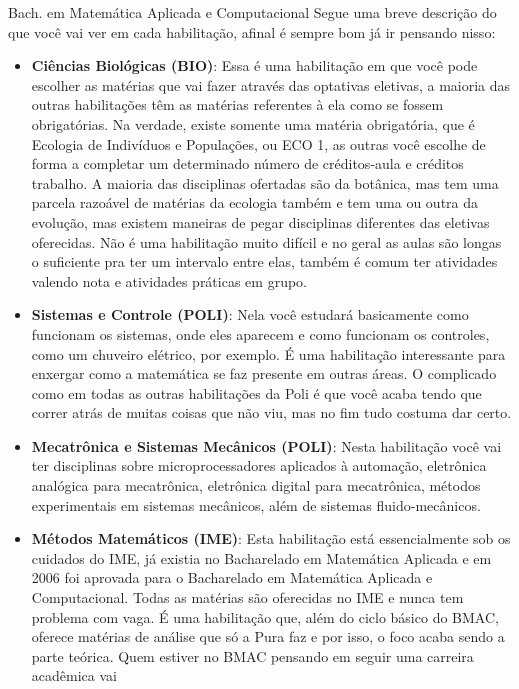 \begin{subsecao}{Bach. em Matemática Aplicada e Computacional}
Segue uma breve descrição do que você vai ver em cada habilitação, afinal é sempre bom já ir pensando nisso:

\begin{itemize}
  \item \textbf{Ciências Biológicas (BIO)}:
    Essa é uma habilitação em que você pode escolher as matérias que vai fazer
    através das optativas eletivas, a maioria das outras habilitações têm as
    matérias referentes à ela como se fossem obrigatórias. Na verdade, existe
    somente uma matéria obrigatória, que é Ecologia de Indivíduos e Populações,
    ou ECO 1, as outras você escolhe de forma a completar um determinado número
    de créditos-aula e créditos trabalho. A maioria das disciplinas ofertadas
    são da botânica, mas tem uma parcela razoável de matérias da ecologia também
    e tem uma ou outra da evolução, mas existem maneiras de pegar disciplinas
    diferentes das eletivas oferecidas. Não é uma habilitação muito difícil e no
    geral as aulas são longas o suficiente pra ter um intervalo entre elas,
    também é comum ter atividades valendo nota e atividades práticas em grupo.
  \item \textbf{Sistemas e Controle (POLI)}: Nela você estudará basicamente como
    funcionam os sistemas, onde eles aparecem e como funcionam os controles,
    como um chuveiro elétrico, por exemplo. É uma habilitação interessante para
    enxergar como a matemática se faz presente em outras áreas. O complicado
    como em todas as outras habilitações da Poli é que você acaba tendo que
    correr atrás de muitas coisas que não viu, mas no fim tudo costuma dar
    certo.
  \item \textbf{Mecatrônica e Sistemas Mecânicos (POLI)}: Nesta habilitação você
    vai ter disciplinas sobre microprocessadores aplicados à automação,
    eletrônica analógica para mecatrônica, eletrônica digital para mecatrônica,
    métodos experimentais em sistemas mecânicos, além de sistemas
    fluido-mecânicos.
  \item \textbf{Métodos Matemáticos (IME)}: Esta habilitação está essencialmente
    sob os cuidados do IME, já existia no Bacharelado em Matemática Aplicada e
    em 2006 foi aprovada para o Bacharelado em Matemática Aplicada e
    Computacional. Todas as matérias são oferecidas no IME e nunca tem problema
    com vaga. É uma habilitação que, além do ciclo básico do BMAC, oferece
    matérias de análise que só a Pura faz e por isso, o foco acaba sendo a parte
    teórica. Quem estiver no BMAC pensando em seguir uma carreira acadêmica vai

\end{itemize}
\end{subsecao}
